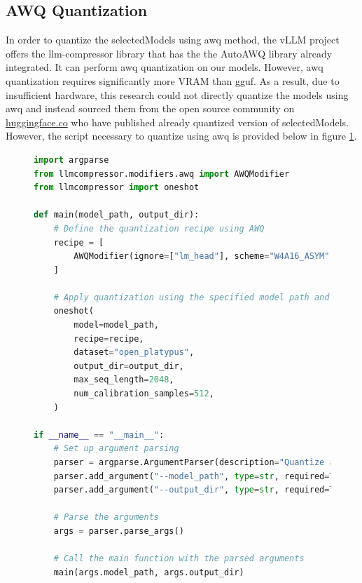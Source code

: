 \documentclass{ifacconf}
\begin{document}
    \subsection{AWQ Quantization}
    In order to quantize the \gls{selectedModels} using \gls{awq} method, the vLLM project offers the llm-compressor library \cite{lllm-compressor} that has the the AutoAWQ library already integrated. It can perform \gls{awq} quantization on our models. However, \gls{awq} quantization requires significantly more VRAM than \gls{gguf}. As a result, due to insufficient hardware, this research could not directly quantize the models using \gls{awq} and instead sourced them from the open source community on \url{huggingface.co} who have published already quantized version of \gls{selectedModels}. However, the script necessary to quantize using \gls{awq} is provided below in figure \ref{awq-script}.

    \begin{figure}[H]
        \centering
    \begin{lstlisting}[language=python,numbers=none]
import argparse
from llmcompressor.modifiers.awq import AWQModifier
from llmcompressor import oneshot

def main(model_path, output_dir):
    # Define the quantization recipe using AWQ
    recipe = [
        AWQModifier(ignore=["lm_head"], scheme="W4A16_ASYM", targets=["Linear"]),
    ]

    # Apply quantization using the specified model path and output directory
    oneshot(
        model=model_path,
        recipe=recipe,
        dataset="open_platypus",
        output_dir=output_dir,
        max_seq_length=2048,
        num_calibration_samples=512,
    )

if __name__ == "__main__":
    # Set up argument parsing
    parser = argparse.ArgumentParser(description="Quantize an LLM model using AWQ.")
    parser.add_argument("--model_path", type=str, required=True, help="Path to the local model directory.")
    parser.add_argument("--output_dir", type=str, required=True, help="Directory to save the quantized model.")

    # Parse the arguments
    args = parser.parse_args()

    # Call the main function with the parsed arguments
    main(args.model_path, args.output_dir)

    \end{lstlisting}
    \label{awq-script}
    \end{figure}
\end{document}
